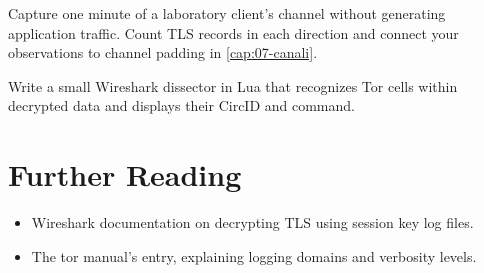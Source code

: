 \begin{esercizio}[2]\label{es:20-padding}
Capture one minute of a laboratory client's channel without generating application traffic. Count TLS records in each direction and connect your observations to channel padding in \cref{cap:07-canali}.
\end{esercizio}

\begin{esercizio}[3]\label{es:20-dissector}
Write a small Wireshark dissector in Lua that recognizes Tor cells within decrypted data and displays their CircID and command.
\end{esercizio}

\section*{Further Reading}
\begin{itemize}
  \item Wireshark documentation on decrypting TLS using session key log files.
  \item The tor manual's  entry, explaining logging domains and verbosity levels.
\end{itemize}
